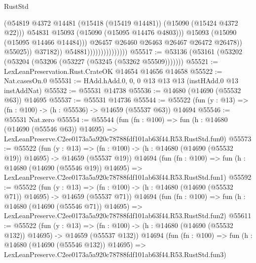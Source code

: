 \begin{lexlean}{RustStd}
\begin{coremodule}
                                                  (@54819
                                                    @4372
                                                    @14481
                                                    (@15418 (@15419 @14481))
                                                    (@15090 (@15424 @4372 @22)))
                                                  @54831
                                                  @15093
                                                  (@15090 (@15095 @14476 @4803)))
                                                @15093
                                                (@15090 (@15095 @14466 @14484)))
                                              @26457
                                              @26460
                                              @26463
                                              @26467
                                              @26472
                                              @26478))
                                          @55025))
                                      @37182))
                                  @54881)))))))))))))))
@55517 := @53136 (@53161 (@53202 (@53204 (@53206 (@53227 (@53245 (@53262 @55509)))))))
@55521 := LexLeanPreservation.Rust.CrateOK @14654 @14656 @14658
@55522 := Nat.casesOn.{0}
@55531 := HAdd.hAdd.{0, 0, 0} @13 @13 @13 (instHAdd.{0} @13 instAddNat)
@55532 := @55531 @14738
@55536 := @14680 (@14690 (@55532 @63)) @14695
@55537 := @55531 @14736
@55544 := @55522 (fun (y : @13) => (fn : @100) -> (h : @55536) -> @14659 (@55537 @63)) @14694
@55546 := @55531 Nat.zero
@55554 := @55544
    (fun (fn : @100) =>
    fun (h : @14680 (@14690 (@55546 @63)) @14695) =>
    LexLeanPreserve.C2ee0173a5a920c78788fdf101ab63f44.R53.RustStd.fun0)
@55573 := @55522
    (fun (y : @13) =>
    (fn : @100) -> (h : @14680 (@14690 (@55532 @19)) @14695) -> @14659 (@55537 @19))
    @14694
    (fun (fn : @100) =>
    fun (h : @14680 (@14690 (@55546 @19)) @14695) =>
    LexLeanPreserve.C2ee0173a5a920c78788fdf101ab63f44.R53.RustStd.fun1)
@55592 := @55522
    (fun (y : @13) =>
    (fn : @100) -> (h : @14680 (@14690 (@55532 @71)) @14695) -> @14659 (@55537 @71))
    @14694
    (fun (fn : @100) =>
    fun (h : @14680 (@14690 (@55546 @71)) @14695) =>
    LexLeanPreserve.C2ee0173a5a920c78788fdf101ab63f44.R53.RustStd.fun2)
@55611 := @55522
    (fun (y : @13) =>
    (fn : @100) -> (h : @14680 (@14690 (@55532 @132)) @14695) -> @14659 (@55537 @132))
    @14694
    (fun (fn : @100) =>
    fun (h : @14680 (@14690 (@55546 @132)) @14695) =>
    LexLeanPreserve.C2ee0173a5a920c78788fdf101ab63f44.R53.RustStd.fun3)

\end{coremodule}
\end{lexlean}
